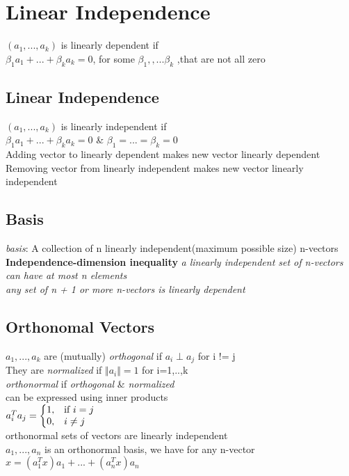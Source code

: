 \section{Linear Independence}
$(a_1,...,a_k)$ is linearly dependent if\\
$\beta_1 a_1+...+\beta_k a_k = 0$, for some $\beta_1,,...\beta_k$ ,that are not all zero
\subsection{Linear Independence}
$(a_1,...,a_k)$ is linearly independent if\\
$\beta_1 a_1+...+\beta_k a_k = 0$ \& $\beta_1 =...= \beta_k =0$\\
\textbullet Adding vector to linearly dependent makes new vector linearly dependent\\
\textbullet Removing vector from linearly independent makes new vector linearly independent\\
\subsection{Basis}
\textit{basis}: A collection of n linearly independent(maximum possible size) n-vectors
\textbf{Independence-dimension inequality}
\textbullet \textit{a linearly independent set of n-vectors can have at most n elements}\\
\textbullet \textit{any set of n + 1 or more n-vectors is linearly dependent}

\subsection{Orthonomal Vectors}
$a_1,...,a_k$ are (mutually) \textit{orthogonal} if $a_i \perp a_j$ for i != j\\
They are \textit{normalized} if $\Vert a_i\Vert = 1$ for i=1,..,k\\
\textbullet \textit{orthonormal} if \textit{orthogonal} \& \textit{normalized}\\
\textbullet can be expressed using inner products\\
$
a_i^Ta_j = \left\{
  \begin{array}{@{}ll@{}}
    1, & \text{if}\ i=j \\
    0, & i \neq j
  \end{array}\right.
$\\
\textbullet orthonormal sets of vectors are linearly independent\\
\textbullet $a_1,. . . ,a_n$ is an orthonormal basis, we have for any n-vector $x = ( a^T_1 x ) a_1 +...+ ( a^T_n x ) a_n$
